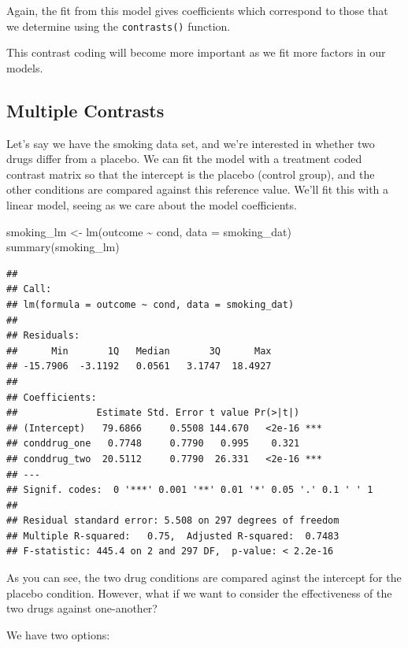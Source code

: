 \documentclass[
]{book}
\newenvironment{Shaded}{\begin{snugshade}}{\end{snugshade}}
\newcommand{\AttributeTok}[1]{\textcolor[rgb]{0.77,0.63,0.00}{#1}}
\newcommand{\FunctionTok}[1]{\textcolor[rgb]{0.00,0.00,0.00}{#1}}
\newcommand{\NormalTok}[1]{#1}
\newcommand{\OtherTok}[1]{\textcolor[rgb]{0.56,0.35,0.01}{#1}}
\newcommand{\SpecialCharTok}[1]{\textcolor[rgb]{0.00,0.00,0.00}{#1}}
\begin{document}
Again, the fit from this model gives coefficients which correspond to those that we determine using the \texttt{contrasts()} function.

This contrast coding will become more important as we fit more factors in our models.

\hypertarget{multiple-contrasts}{%
\subsection{Multiple Contrasts}\label{multiple-contrasts}}

Let's say we have the smoking data set, and we're interested in whether two drugs differ from a placebo. We can fit the model with a treatment coded contrast matrix so that the intercept is the placebo (control group), and the other conditions are compared against this reference value. We'll fit this with a linear model, seeing as we care about the model coefficients.

\begin{Shaded}
\begin{Highlighting}[]
\NormalTok{smoking\_lm }\OtherTok{\textless{}{-}} \FunctionTok{lm}\NormalTok{(outcome }\SpecialCharTok{\textasciitilde{}}\NormalTok{ cond, }\AttributeTok{data =}\NormalTok{ smoking\_dat)}
\FunctionTok{summary}\NormalTok{(smoking\_lm)}
\end{Highlighting}
\end{Shaded}

\begin{verbatim}
## 
## Call:
## lm(formula = outcome ~ cond, data = smoking_dat)
## 
## Residuals:
##      Min       1Q   Median       3Q      Max 
## -15.7906  -3.1192   0.0561   3.1747  18.4927 
## 
## Coefficients:
##              Estimate Std. Error t value Pr(>|t|)    
## (Intercept)   79.6866     0.5508 144.670   <2e-16 ***
## conddrug_one   0.7748     0.7790   0.995    0.321    
## conddrug_two  20.5112     0.7790  26.331   <2e-16 ***
## ---
## Signif. codes:  0 '***' 0.001 '**' 0.01 '*' 0.05 '.' 0.1 ' ' 1
## 
## Residual standard error: 5.508 on 297 degrees of freedom
## Multiple R-squared:   0.75,  Adjusted R-squared:  0.7483 
## F-statistic: 445.4 on 2 and 297 DF,  p-value: < 2.2e-16
\end{verbatim}

As you can see, the two drug conditions are compared aginst the intercept for the placebo condition. However, what if we want to consider the effectiveness of the two drugs against one-another?

We have two options:
\end{document}
